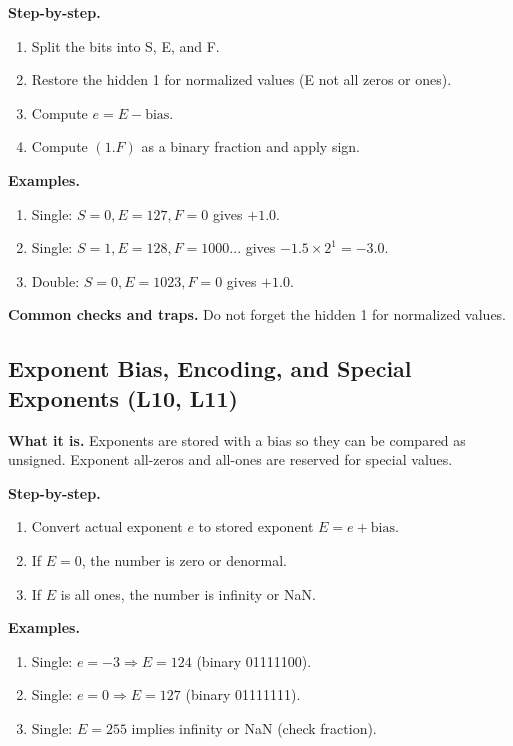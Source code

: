 \documentclass[11pt]{article}
\begin{document}
\textbf{Step-by-step.}
\begin{enumerate}[leftmargin=*]
  \item Split the bits into S, E, and F.
  \item Restore the hidden 1 for normalized values (E not all zeros or ones).
  \item Compute $e = E - \text{bias}$.
  \item Compute $(1.F)$ as a binary fraction and apply sign.
\end{enumerate}

\textbf{Examples.}
\begin{enumerate}[leftmargin=*]
  \item Single: $S=0, E=127, F=0$ gives $+1.0$.
  \item Single: $S=1, E=128, F=1000...$ gives $-1.5 \times 2^1 = -3.0$.
  \item Double: $S=0, E=1023, F=0$ gives $+1.0$.
\end{enumerate}

\textbf{Common checks and traps.} Do not forget the hidden 1 for normalized values.

\begin{figure}[h]
\centering
{}
\end{figure}

\subsection{Exponent Bias, Encoding, and Special Exponents (L10, L11)}
\textbf{What it is.} Exponents are stored with a bias so they can be compared as unsigned. Exponent all-zeros and all-ones are reserved for special values.

\textbf{Step-by-step.}
\begin{enumerate}[leftmargin=*]
  \item Convert actual exponent $e$ to stored exponent $E = e + \text{bias}$.
  \item If $E=0$, the number is zero or denormal.
  \item If $E$ is all ones, the number is infinity or NaN.
\end{enumerate}

\textbf{Examples.}
\begin{enumerate}[leftmargin=*]
  \item Single: $e=-3 \Rightarrow E=124$ (binary 01111100).
  \item Single: $e=0 \Rightarrow E=127$ (binary 01111111).
  \item Single: $E=255$ implies infinity or NaN (check fraction).
\end{enumerate}
\end{document}
